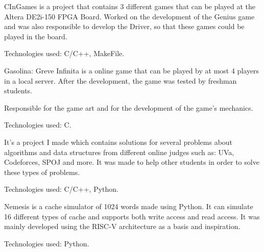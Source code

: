 \documentclass[]{deedy-resume-openfont}
\begin{document}
\begin{minipage}[t]{0.66\textwidth}
\begin{tightemize}
\item {CInGames is a project that contains 3 different games that can be played at the Altera DE2i-150 FPGA Board. Worked on the development of the Genius game and was also responsible to develop the Driver, so that these games could be played in the board. }
\item {Technologies used: C/C++, MakeFile.}
\end{tightemize}

\begin{tightemize}
\item {Gasolina: Greve Infinita is a online game that can be played by at most 4 players in a local server. After the development, the game was tested by freshman students.}
\item {Responsible for the game art and for the development of the game's mechanics.} 
\item {Technologies used: C.}
\end{tightemize}

\begin{tightemize}
\item {It's a project I made which contains solutions for several problems about algorithms and data structures from different online judges such as: UVa, Codeforces, SPOJ and more. It was made to help other students in order to solve these types of problems.}
\item {Technologies used: C/C++, Python.}
\end{tightemize}

\begin{tightemize}
\item {Nemesis is a cache simulator of 1024 words made using Python. It can simulate 16 different types of cache and supports both write access and read access. It was mainly developed using the RISC-V architecture as a basis and inspiration.}
\item {Technologies used: Python.}
\end{tightemize}


\end{minipage}
\end{document}
